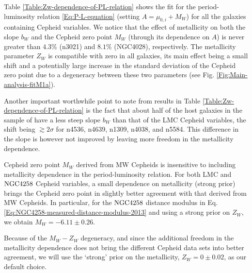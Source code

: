 Table \ref{Table:Zw-dependence-of-PL-relation} shows the fit for the period-luminosity relation \eqref{Eq:P-L-equation}  (setting $A=\mu_{0,i} + M_W$) for all the galaxies containing Cepheid variables. We notice that the effect of metallicity on both the slope $b_W$ and the Cepheid zero point $M_W$ (through its dependence on $A$) is never greater than $4.3\%$ (n3021) and $8.1\%$ (NGC4028), respectively. The metallicity parameter $Z_W$ is compatible with zero in all galaxies, its main effect being a small shift and a potentially large increase in the standard deviation of the Cepheid zero point due to a degeneracy between these two parameters (see Fig. \ref{Fig:Main-analysis-fitM1a}). 

Another important worthwhile point to note from results in Table \ref{Table:Zw-dependence-of-PL-relation} is the fact that about half of the host galaxies in the sample of \cite{Riess:2011yx} have a less steep slope $b_W$ than that of the LMC Cepheid variables, the shift being $\gtrsim 2\sigma$ for n4536, n4639, n1309, n4038, and n5584. This difference in the slope is however not improved by leaving more freedom in the metallicity dependence.

Cepheid zero point $M_W$ derived from MW Cepheids is insensitive to including metallicity dependence in the period-luminosity relation. For both LMC and $\mathrm{NGC4258}$ Cepheid variables, a small dependence on metallicity (strong prior) brings the Cepheid zero point in slightly better agreement with that derived from MW Cepheids. In particular, for the $\mathrm{NGC4258}$ distance modulus in Eq. \eqref{Eq:NGC4258-measured-distance-modulus-2013} and using a strong prior on $Z_W$, we obtain $M_W=-6.11 \pm 0.26$.

Because of the $M_W - Z_W$ degeneracy, and since the additional freedom in the metallicity dependence does not bring the different Cepheid data sets into better agreement,
we will use the `strong' prior on the metallicity, $Z_W = 0 \pm 0.02$, as our default choice.

